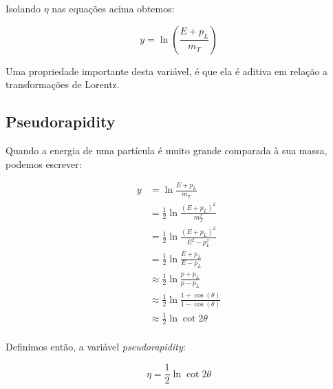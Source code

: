 Isolando $\eta$ nas equações acima obtemos:

\begin{equation}
 y = \ln{(\frac{E+p_{L}}{m_{T}})}
\end{equation}

Uma propriedade importante desta variável, é que ela é aditiva em relação a transformações de Lorentz.

\subsection{Pseudorapidity}

Quando a energia de uma partícula é muito grande comparada à sua massa, podemos escrever:

\begin{equation}
\begin{split}
 y   & = \ln{\frac{E+p_{L}}{m_{T}}} \\
     & = \frac{1}{2}\ln{\frac{(E+p_{L})^2}{m_{T}^2}} \\
     & = \frac{1}{2}\ln{\frac{(E+p_{L})^2}{E^2-p_{L}^2}} \\
     & = \frac{1}{2}\ln{\frac{E+p_{L}}{E-p_{L}}} \\
     & \approx \frac{1}{2}\ln{\frac{p+p_{L}}{p-p_{L}}} \\
     & \approx \frac{1}{2}\ln{\frac{1+\cos(\theta)}{1-\cos(\theta)}} \\
     & \approx \frac{1}{2}\ln{\cot{2\theta}} \\
\end{split}
\end{equation}

Definimos então, a variável {\it pseudorapidity}:

\begin{equation}
 \eta = \frac{1}{2}\ln{\cot{2\theta}}
\end{equation}

